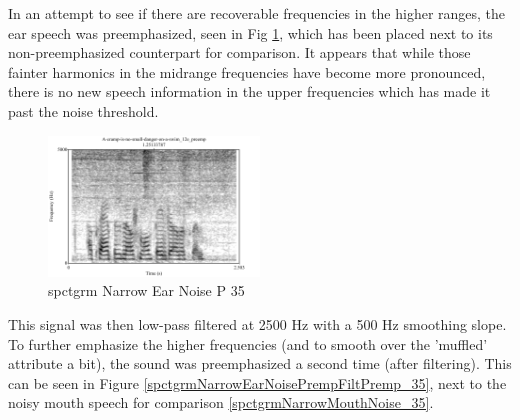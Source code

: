 \documentclass[dissertation,copyright]{uathesis}
\begin{document}
In an attempt to see if there are recoverable frequencies in the higher ranges, the ear speech was preemphasized, seen in Fig \ref{spctgrmNarrowEarNoisePremp_35}, which has been placed next to its non-preemphasized counterpart for comparison.  It appears that while those fainter harmonics in the midrange frequencies have become more pronounced, there is no new speech information in the upper frequencies which has made it past the noise threshold.

\begin{figure}
\includegraphics[width=0.5\textwidth]{figure/spctgrmNarrowEarNoisePremp.pdf}
\caption{spctgrm Narrow Ear Noise P 35}
\label{spctgrmNarrowEarNoisePremp_35}
\end{figure}

This signal was then low-pass filtered at 2500 Hz with a 500 Hz smoothing slope. To further emphasize the higher frequencies (and to smooth over the 'muffled' attribute a bit), the sound was preemphasized a second time (after filtering).  This can be seen in Figure \ref{spctgrmNarrowEarNoisePrempFiltPremp_35}, next to the noisy mouth speech for comparison \ref{spctgrmNarrowMouthNoise_35}.
\end{document}
